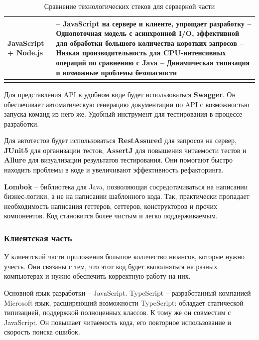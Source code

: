 \documentclass[a4paper,article]{article}
\begin{document}
\begin{sloppypar}
\begin{xltabular}{\textwidth} { |
        >{\hsize} X |
        >{\hsize} X | }
        \hline
        JavaScript + Node.js
        & -- JavaScript на сервере и клиенте, упрощает разработку \newline -- Однопоточная модель с асинхронной I/O, эффективной для обработки большого количества коротких запросов \newline -- Низкая производительность для CPU-интенсивных операций по сравнению с Java \newline -- Динамическая типизация и возможные проблемы безопасности \\

        \hline

        \caption{\centering Сравнение технологических стеков для серверной части}

        \label{tab:Сравнение технологических стеков для серверной части}
    \end{xltabular}

    Для представления API в удобном виде будет использоваться \textbf{Swagger}. Он обеспечивает автоматическую генерацию документации по API с возможностью запуска команд из него же. Удобный инструмент для тестирования в процессе разработки.

    Для автотестов будет использоваться \textbf{RestAssured} для запросов на сервер, \textbf{JUnit5} для организации тестов, \textbf{AssertJ} для повышения читаемости тестов и \textbf{Allure} для визуализации результатов тестирования. Они помогают быстро находить проблемы в коде и увеличивают эффективность рефакторинга.

    \textbf{Lombok} -- библиотека для Java, позволяющая сосредотачиваться на написании бизнес-логики, а не на написании шаблонного кода. Так, практически пропадает необходимость написания геттеров, сеттеров, конструкторов и прочих компонентов. Код становится более чистым и легко поддерживаемым.

    \subsubsection{Клиентская часть}\label{Реализация. Выбор. Клиентская часть}

    У клиентский части приложения большое количество нюансов, которые нужно учесть. Они связаны с тем, что этот код будет выполняться на разных компьютерах и нужно обеспечить корректную работу на них.

    Основной язык разработки -- JavaScript. TypeScript -- разработанный компанией Microsoft язык, расширяющий возможности TypeScript: обладает статической типизацией, поддержкой полноценных классов. К тому же он совместим с JavaScript. Он повышает читаемость кода, его повторное использование и скорость поиска ошибок.


\end{sloppypar}
\end{document}
